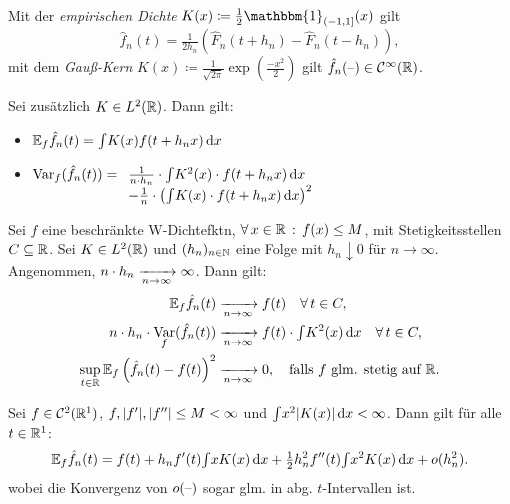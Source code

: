 \documentclass{cheat-sheet}
\newcommand{\E}{\mathbb{E}} %
\newcommand{\ind}{\mathbbm{1}} %
\newcommand{\Cont}{\mathcal{C}} %
\DeclareMathOperator{\var}{Var} %
\begin{document}

\begin{bspe}
  Mit der \emph{empirischen Dichte} $K(x) \coloneqq \tfrac{1}{2} \ind_{\ocinterval{-1}{1}}(x)$ gilt
  \[ \hat{f}_n(t) = \tfrac{1}{2 h_n} \left( \hat{F}_n(t + h_n) - \hat{F}_n(t - h_n) \right), \]
  mit dem \emph{Gauß-Kern} $K(x) \coloneqq \tfrac{1}{\sqrt{2 \pi}}\exp( \tfrac{- x^2}{2})$ gilt $\hat{f}_n(\blank) \in \Cont^\infty(\R)$.
\end{bspe}

\begin{lem}
  Sei zusätzlich $K \in L^2(\mathbb{R})$.
  Dann gilt:
  \begin{itemize}
    \item $\E_f \hat{f}_n(t) = \IInt{K(x) f(t + h_n x)}{x}$
    \item
    $\var_f (\hat{f}_n(t)) = 
    \begin{array}[t]{l}
      \tfrac{1}{n \cdot h_n} \cdot \IInt{K^2(x) \cdot f(t + h_n x)}{x} \\
      - \tfrac{1}{n} \cdot \left( \IInt{K(x) \cdot f(t + h_n x)}{x} \right)^2
    \end{array}$
  \end{itemize}
\end{lem}

\begin{satz}
  Sei $f$ eine beschränkte W-Dichtefktn, $\forall \, {x \in \mathbb{R}} \,:\, f(x) \leq M$, mit Stetigkeitsstellen $C \subseteq \mathbb{R}$.
  Sei $K \in L^2(\mathbb{R})$ und $(h_n)_{n \in \mathbb{N}}$ eine Folge mit $h_n \downarrow 0$ für $n \to \infty$.
  Angenommen, $n \cdot h_n \xrightarrow[n \to \infty]{} \infty$.
  Dann gilt:
  \begin{align*}
    \E_f \hat{f}_n(t) & \xra[n \to \infty]{} f(t) \quad \forall \, t \in C, \\
    n \cdot h_n \cdot \var_f (\hat{f}_n(t)) & \xra[n \to \infty]{} f(t) \cdot \IInt{K^2(x)}{x} \quad \forall \, t \in C, \\
    \sup_{t \in \R} \E_f \left( \hat{f}_n(t) - f(t) \right)^2 & \xra[n \to \infty]{} 0, \quad \text{falls $f$ glm. stetig auf $\R$.}
  \end{align*}
\end{satz}

\begin{satz}
  Sei $f \in \Cont^2(\R^1)$, $f, \lvert f'\rvert, \lvert f''\rvert \leq M < \infty$ und ${\textstyle \int} x^2 \lvert K(x)\rvert \,\mathrm{d} x < \infty$.
  Dann gilt für alle $t \in \mathbb{R}^1$:
  \[
    \E_f \hat{f}_n(t) = f(t) + h_n f'(t) \IInt{x K(x)}{x} + \tfrac{1}{2} h_n^2 f''(t) \IInt{x^2 K(x)}{x} + o(h_n^2).
  \]
  wobei die Konvergenz von $o(\text{--})$ sogar glm. in abg. $t$-Intervallen ist.
\end{satz}
\end{document}

